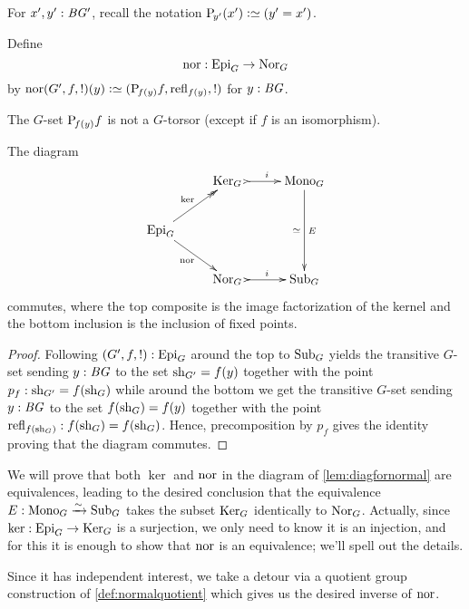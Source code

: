 For $x',y':\mathit{B}\mathit{G}'$, recall the notation $\pathsp{y'}(x')\defequi(y'=x')$.
\begin{definition}
  \label{def:ker2}
  Define $$\nor:\typeepi_G\to\typenormal_G$$
  by $\nor(G',f,!)(y)\defequi(\pathsp{f(y)}f,\refl{f(y)},!)$ for $y:\mathit{B}\mathit{G}$.
\end{definition}
\begin{remark}
  The $G$-set $\mathrm{P}_{\!f(y)}f$ is not a $G$-torsor (except if $f$ is an isomorphism).
\end{remark}

\begin{lemma}
  \label{lem:diagfornormal}
  The diagram
  $$\xymatrix{
  &\typekernel_G\,\,\ar@{>->}[r]^i&\typemono_G\ar[dd]_{\simeq}^{E}\\
  \typeepi_G\ar@{->>}[ur]^{\ker}\ar[dr]_{\nor}&&\\
  &\typenormal_G\,\,\ar@{>->}[r]^i&\typesubgroup_G}
$$
commutes, where the top composite is the image factorization of the kernel and the bottom inclusion is the inclusion of fixed points.
\end{lemma}
\begin{proof}
  Following $(G',f,!):\mathrm{Epi}_G$ around the top to $\mathrm{Sub}_G$ yields the transitive $G$-set sending $y:\mathit{B}\mathit{G}$ to the set $\mathrm{sh}_{G'}=f(y)$ together with the point $p_f:\mathrm{sh}_{G'}=f(\mathrm{sh}_G)$ while around the bottom we get the transitive $G$-set sending $y:\mathit{B}\mathit{G}$ to the set $f(\mathrm{sh}_G)=f(y)$ together with the point $\mathrm{refl}_{f(\mathrm{sh}_G)}:f(\mathrm{sh}_G)=f(\mathrm{sh}_G)$.  Hence, precomposition by $p_f$ gives the identity proving that the diagram commutes.
\end{proof}
We will prove that both $\ker$ and $\nor$ in the diagram of \cref{lem:diagfornormal} are equivalences, leading to the desired conclusion that the equivalence $E:\mathrm{Mono}_G\xrightarrow{\sim}\mathrm{Sub}_G$ takes the subset ${\mathrm{Ker}}_G$ identically to $\mathrm{Nor}_G$.
Actually, since $\ker:\typeepi_G\to\typekernel_G$ is a surjection, we only need to know it is an injection, and for this
it is enough to show that $\nor$ is an equivalence; we'll spell out the details.

Since it has independent interest, we take a detour via a quotient group construction of \cref{def:normalquotient} which gives us the desired inverse of $\nor$.

